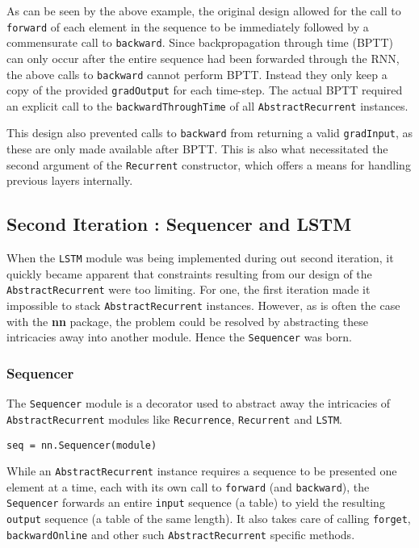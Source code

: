 \documentclass{article} %
\providecommand{\inlinecode}[1]{\texttt{#1}}
\begin{document}
As can be seen by the above example, the original design allowed for 
the call to \inlinecode{forward} of each element in the sequence to 
be immediately followed by a commensurate call to \inlinecode{backward}.
Since backpropagation through time (BPTT)\cite{rumelhart2002learning} can only occur after the entire 
sequence had been forwarded through the RNN, the above calls to \inlinecode{backward}
cannot perform BPTT. Instead they only keep a copy of the provided \inlinecode{gradOutput} for each time-step.
The actual BPTT required an explicit call to the \inlinecode{backwardThroughTime} 
of all \inlinecode{AbstractRecurrent} instances. 

This design also prevented calls to \inlinecode{backward} from
returning a valid \inlinecode{gradInput}, as these are only made available after BPTT.
This is also what necessitated the second argument of the \inlinecode{Recurrent} 
constructor, which offers a means for handling previous layers internally.

\subsection{Second Iteration : Sequencer and LSTM}

When the \inlinecode{LSTM} module was being implemented during out second iteration, 
it quickly became apparent that constraints resulting 
from our design of the \inlinecode{AbstractRecurrent} were too limiting.
For one, the first iteration made it impossible to stack \inlinecode{AbstractRecurrent} instances.
However, as is often the case with the \textbf{nn} package, the problem 
could be resolved by abstracting these intricacies away into another module.
Hence the \inlinecode{Sequencer} was born.

\subsubsection{Sequencer}
The \inlinecode{Sequencer} module is a decorator used to abstract 
away the intricacies of \inlinecode{AbstractRecurrent} modules
like \inlinecode{Recurrence}, \inlinecode{Recurrent} and \inlinecode{LSTM}. 

\begin{verbatim}
seq = nn.Sequencer(module)
\end{verbatim}

While an \inlinecode{AbstractRecurrent} instance requires a sequence to be presented one element at a time, 
each with its own call to \inlinecode{forward} (and \inlinecode{backward}), 
the \inlinecode{Sequencer} forwards an entire \inlinecode{input} sequence (a table) 
to yield the resulting \inlinecode{output} sequence (a table of the same length). 
It also takes care of calling \inlinecode{forget}, \inlinecode{backwardOnline} and 
other such \inlinecode{AbstractRecurrent} specific methods.
\end{document}

